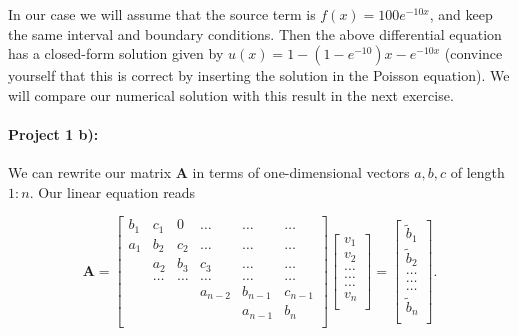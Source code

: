 \documentclass[%
oneside,                 %
final,                   %
10pt]{article}
\begin{document}
In our case we will assume  that the source term is 
$f(x) = 100e^{-10x}$, and keep the same interval and boundary 
conditions. Then the above differential equation
has a closed-form  solution given by $u(x) = 1-(1-e^{-10})x-e^{-10x}$ (convince yourself that this is correct by inserting the
solution in the Poisson equation).  We will compare
our numerical solution with this result in the next exercise. 

\paragraph{Project 1 b):}
We can rewrite our matrix $\mathbf{A}$ in terms of one-dimensional vectors $a,b,c$  
of length $1:n$. 
Our linear equation reads

\[
    \mathbf{A} = \begin{bmatrix}
                           b_1& c_1 & 0 &\dots   & \dots &\dots \\
                           a_1 & b_2 & c_2 &\dots &\dots &\dots \\
                           & a_2 & b_3 & c_3 & \dots & \dots \\
                           & \dots   & \dots &\dots   &\dots & \dots \\
                           &   &  &a_{n-2}  &b_{n-1}& c_{n-1} \\
                           &    &  &   &a_{n-1} & b_n \\
                      \end{bmatrix}\begin{bmatrix}
                           v_1\\
                           v_2\\
                           \dots \\
                          \dots  \\
                          \dots \\
                           v_n\\
                      \end{bmatrix}
  =\begin{bmatrix}
                           \tilde{b}_1\\
                           \tilde{b}_2\\
                           \dots \\
                           \dots \\
                          \dots \\
                           \tilde{b}_n\\
                      \end{bmatrix}.
\]
\end{document}
